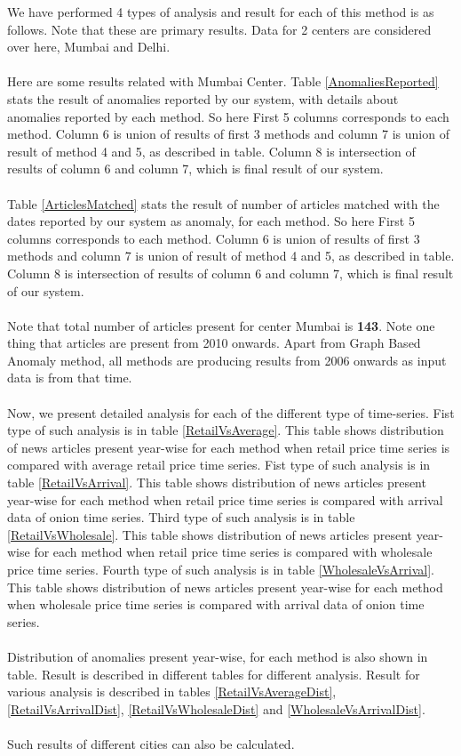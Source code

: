 \documentclass[a4paper,10pt]{report}
\begin{document}
We have performed 4 types of analysis and result for each of this method is as 
follows. Note that these are primary results. Data for 2 centers are considered 
over here, Mumbai and Delhi.\\
\\
Here are some results related with Mumbai Center. Table \ref{AnomaliesReported} stats the result of anomalies reported by our system, with details about anomalies reported by each method. So here First 5 columns corresponds to each method. Column 6 is union of results of first 3 methods and column 7 is union of result of method 4 and 5, as described in table. Column 8 is intersection of results of column 6 and column 7, which is final result of our system.\\
\\
Table \ref{ArticlesMatched} stats the result of number of articles matched with the dates reported by our system as anomaly, for each method. So here First 5 columns corresponds to each method. Column 6 is union of results of first 3 methods and column 7 is union of result of method 4 and 5, as described in table. Column 8 is intersection of results of column 6 and column 7, which is final result of our system.\\
\\
Note that total number of articles present for center Mumbai is \textbf{143}. Note one thing that articles are present from 2010 onwards. Apart from Graph Based Anomaly method, all methods are producing results from 2006 onwards as input data is from that time.\\
 \\
Now, we present detailed analysis for each of the different type of time-series. Fist type of such analysis is in table \ref{RetailVsAverage}. This table shows distribution of news articles present year-wise for each method when retail price time series is compared with average retail price time series. Fist type of such analysis is in table \ref{RetailVsArrival}. This table shows distribution of news articles present year-wise for each method when retail price time series is compared with arrival data of onion time series. Third type of such analysis is in table \ref{RetailVsWholesale}. This table shows distribution of news articles present year-wise for each method when retail price time series is compared with wholesale price time series. Fourth type of such analysis is in table \ref{WholesaleVsArrival}. This table shows distribution of news articles present year-wise for each method when wholesale price time series is compared with arrival data of onion time series.\\
\\
Distribution of anomalies present year-wise, for each method is also shown in table. Result is described in different tables for different analysis. Result for various analysis is described in tables  \ref{RetailVsAverageDist}, \ref{RetailVsArrivalDist}, \ref{RetailVsWholesaleDist} and \ref{WholesaleVsArrivalDist}.\\
\\
Such results of different cities can also be calculated.
\end{document}
